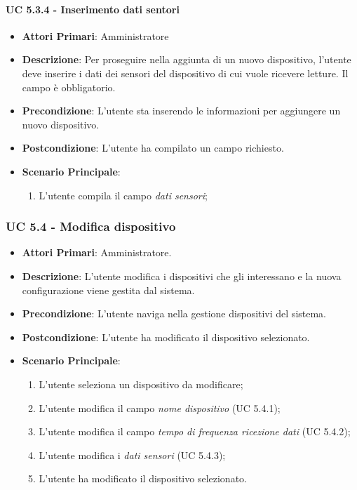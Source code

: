 				\paragraph{UC 5.3.4 - Inserimento dati sentori}
				\begin{itemize}
					\item \textbf{Attori Primari}: Amministratore
					\item \textbf{Descrizione}: Per proseguire nella aggiunta di un nuovo dispositivo, l'utente deve inserire i dati dei sensori del dispositivo di cui vuole ricevere letture. Il campo è obbligatorio.
					\item \textbf{Precondizione}: L'utente sta inserendo le informazioni per aggiungere un nuovo dispositivo.
					\item \textbf{Postcondizione}: L'utente ha compilato un campo richiesto.
					\item \textbf{Scenario Principale}:
					\begin{enumerate}
						\item{L'utente compila il campo \textit{dati sensori};}
					\end{enumerate}
				\end{itemize}

			
			\subsubsection{UC 5.4 - Modifica dispositivo}
			\begin{itemize}
				\item \textbf{Attori Primari}: Amministratore.
				\item \textbf{Descrizione}: L'utente modifica i dispositivi che gli interessano e la nuova configurazione viene gestita dal sistema.
				\item \textbf{Precondizione}: L'utente naviga nella gestione dispositivi del sistema.
				\item \textbf{Postcondizione}: L'utente ha modificato il dispositivo selezionato.
				\item \textbf{Scenario Principale}:
				\begin{enumerate}
					\item{L'utente seleziona un dispositivo da modificare;}
					\item{L'utente modifica il campo \textit{nome dispositivo} (UC 5.4.1);}
					\item{L'utente modifica il campo \textit{tempo di frequenza ricezione dati} (UC 5.4.2);}
					\item{L'utente modifica i \textit{dati sensori} (UC 5.4.3);}
					\item{L'utente ha modificato il dispositivo selezionato.}
				\end{enumerate}
			\end{itemize}

